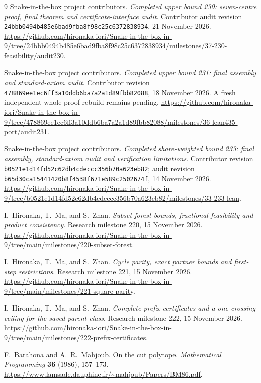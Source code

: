 \documentclass[11pt,a4paper]{article}
\begin{document}
\begin{thebibliography}{9}
Snake-in-the-box project contributors. \emph{Completed upper bound 230:
seven-centre proof, final theorem and certificate-interface audit}.
Contributor audit revision \texttt{24bbb0494b485e6bad9fba8f98c25c6372838934},
21 November 2026.
\url{https://github.com/hironaka-iori/Snake-in-the-box-in-9/tree/24bbb0494b485e6bad9fba8f98c25c6372838934/milestones/37-230-feasibility/audit230}.

Snake-in-the-box project contributors. \emph{Completed upper bound 231:
final assembly and standard-axiom audit}. Contributor revision
\texttt{478869ee1ec6ff3a10ddb6ba7a2a1d89fbb82088}, 18 November 2026.
A fresh independent whole-proof rebuild remains pending.
\url{https://github.com/hironaka-iori/Snake-in-the-box-in-9/tree/478869ee1ec6ff3a10ddb6ba7a2a1d89fbb82088/milestones/36-lean435-port/audit231}.

Snake-in-the-box project contributors. \emph{Completed share-weighted bound
233: final assembly, standard-axiom audit and verification limitations}.
Contributor revision \texttt{b0521e1d14fd52c62db4cdeccc356b70a623eb82};
audit revision \texttt{b65d30ca15441420b8f4538f671e589c2502674f},
14 November 2026.
\url{https://github.com/hironaka-iori/Snake-in-the-box-in-9/tree/b0521e1d14fd52c62db4cdeccc356b70a623eb82/milestones/33-233-lean}.


I.~Hironaka, T.~Ma, and S.~Zhan. \emph{Subset forest bounds,
fractional feasibility and product consistency}. Research milestone 220,
15 November 2026.
\url{https://github.com/hironaka-iori/Snake-in-the-box-in-9/tree/main/milestones/220-subset-forest}.

I.~Hironaka, T.~Ma, and S.~Zhan. \emph{Cycle parity, exact partner bounds
and first-step restrictions}. Research milestone 221, 15 November 2026.
\url{https://github.com/hironaka-iori/Snake-in-the-box-in-9/tree/main/milestones/221-square-parity}.

I.~Hironaka, T.~Ma, and S.~Zhan. \emph{Complete prefix certificates
and a one-crossing ceiling for the saved parent class}.
Research milestone 222, 15 November 2026.
\url{https://github.com/hironaka-iori/Snake-in-the-box-in-9/tree/main/milestones/222-prefix-certificates}.

F.~Barahona and A.~R.~Mahjoub. On the cut polytope.
\emph{Mathematical Programming} \textbf{36} (1986), 157--173.
\url{https://www.lamsade.dauphine.fr/~mahjoub/Papers/BM86.pdf}.


\end{thebibliography}
\end{document}
